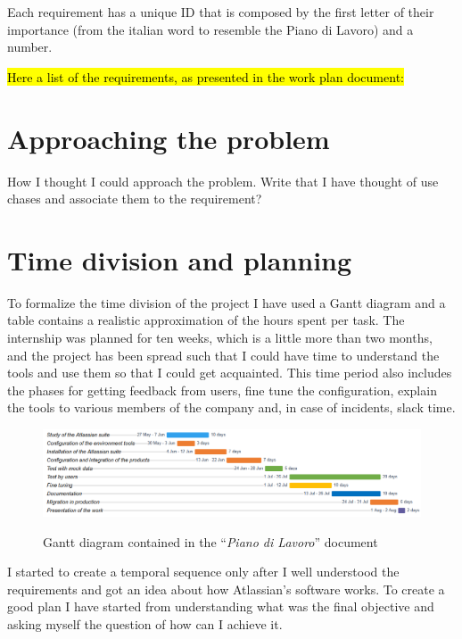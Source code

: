 	Each requirement has a unique ID that is composed by the first letter of their importance (from the italian word to resemble the Piano di Lavoro) and a number.

	\hl{Here a list of the requirements, as presented in the work plan document:}


\section{Approaching the problem}

	How I thought I could approach the problem.
	Write that I have thought of use chases and associate them to the requirement?

\section{Time division and planning}

	To formalize the time division of the project I have used a Gantt diagram and a table contains a realistic approximation of the hours spent per task.
	The internship was planned for ten weeks, which is a little more than two months, and the project has been spread such that I could have time to understand the tools and use them so that I could get acquainted.
	This time period also includes the phases for getting feedback from users, fine tune the configuration, explain the tools to various members of the company and, in case of incidents, slack time.
	\begin{figure}[H]
		\centering
		\includegraphics[width=1.1\textwidth]{resources/work_plan_gantt}\\
		\caption{Gantt diagram contained in the ``\textit{Piano di Lavoro}'' document}
	\end{figure}
	I started to create a temporal sequence only after I well understood the requirements and got an idea about how Atlassian's software works.
	To create a good plan I have started from understanding what was the final objective and asking myself the question of how can I achieve it.
	
	
